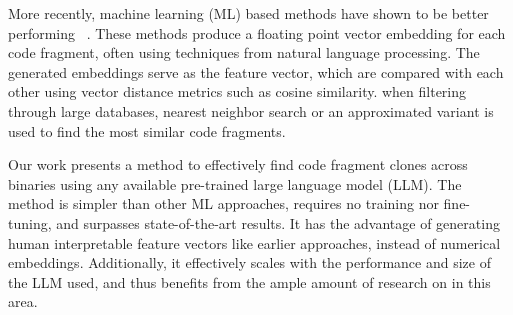 More recently, machine learning (ML) based methods have shown to be better performing ~\cite{SAFE,PalmTree,OrderMatters,Asm2Vec,CLAP}.
These methods produce a floating point vector embedding for each code fragment, often using techniques from
natural language processing. The generated embeddings serve as the feature vector, which are compared
with each other using vector distance metrics such as cosine similarity. when filtering through large databases,
nearest neighbor search or an approximated variant is used to find the most similar code fragments.

Our work presents a method to effectively find code fragment clones across binaries using any available pre-trained
large language model (LLM). The method is simpler than other ML approaches, requires no training nor fine-tuning, and
surpasses state-of-the-art results. It has the advantage of generating human interpretable feature vectors like earlier approaches,
instead of numerical embeddings. Additionally, it effectively scales with the performance and size of the LLM used, and thus
benefits from the ample amount of research on in this area.

